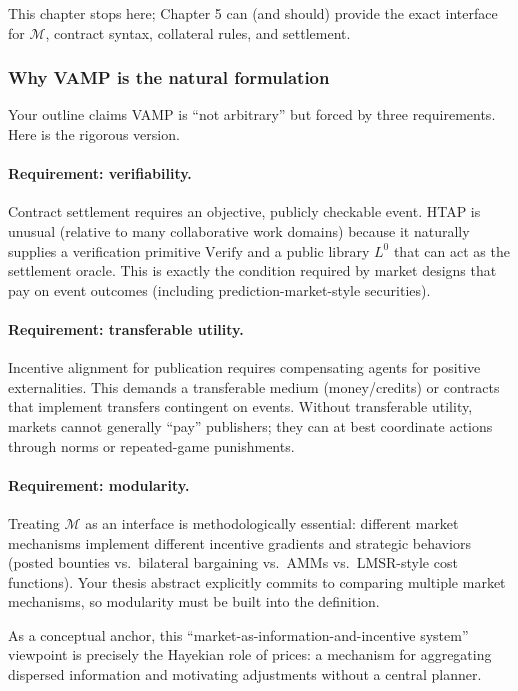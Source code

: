This chapter stops here; Chapter 5 can (and should) provide the exact interface for \(\mathcal{M}\), contract syntax, collateral rules, and settlement.

\subsubsection{Why VAMP is the natural formulation}

Your outline claims VAMP is ``not arbitrary'' but forced by three requirements. Here is the rigorous version.

\paragraph{Requirement: verifiability.}
Contract settlement requires an objective, publicly checkable event. HTAP is unusual (relative to many collaborative work domains) because it naturally supplies a verification primitive \(\mathrm{Verify}\) and a public library \(L^0\) that can act as the settlement oracle. This is exactly the condition required by market designs that pay on event outcomes (including prediction-market-style securities).

\paragraph{Requirement: transferable utility.}
Incentive alignment for publication requires compensating agents for positive externalities. This demands a transferable medium (money/credits) or contracts that implement transfers contingent on events. Without transferable utility, markets cannot generally ``pay'' publishers; they can at best coordinate actions through norms or repeated-game punishments.

\paragraph{Requirement: modularity.}
Treating \(\mathcal{M}\) as an interface is methodologically essential: different market mechanisms implement different incentive gradients and strategic behaviors (posted bounties vs.\ bilateral bargaining vs.\ AMMs vs.\ LMSR-style cost functions). Your thesis abstract explicitly commits to comparing multiple market mechanisms, so modularity must be built into the definition.

As a conceptual anchor, this ``market-as-information-and-incentive system'' viewpoint is precisely the Hayekian role of prices: a mechanism for aggregating dispersed information and motivating adjustments without a central planner.

